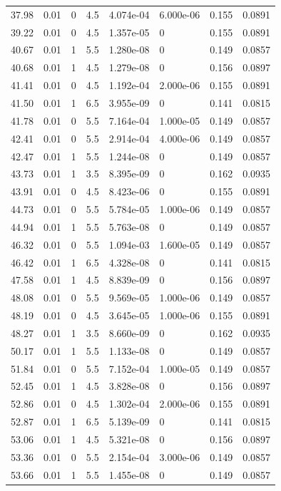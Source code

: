 \documentclass[preview]{standalone}
\begin{document}
{{{\begin{tabular}{L{1.2cm}C{1.2cm} C{0.3cm}C{0.5cm} C{1.4cm}C{1.4cm} C{1.4cm}C{1.4cm}}
  37.98  &  0.01  & 0     & 4.5 &  4.074e-04  & 6.000e-06  & 0.155 &  0.0891   \\ 
  39.22  &  0.01  & 0     & 4.5 &  1.357e-05  & 0  & 0.155 &  0.0891   \\ 
  40.67  &  0.01  & 1     & 5.5 &  1.280e-08  & 0  & 0.149 &  0.0857   \\ 
  40.68  &  0.01  & 1     & 4.5 &  1.279e-08  & 0  & 0.156 &  0.0897   \\ 
  41.41  &  0.01  & 0     & 4.5 &  1.192e-04  & 2.000e-06  & 0.155 &  0.0891   \\ 
  41.50  &  0.01  & 1     & 6.5 &  3.955e-09  & 0  & 0.141 &  0.0815   \\ 
  41.78  &  0.01  & 0     & 5.5 &  7.164e-04  & 1.000e-05  & 0.149 &  0.0857   \\ 
  42.41  &  0.01  & 0     & 5.5 &  2.914e-04  & 4.000e-06  & 0.149 &  0.0857   \\ 
  42.47  &  0.01  & 1     & 5.5 &  1.244e-08  & 0  & 0.149 &  0.0857   \\ 
  43.73  &  0.01  & 1     & 3.5 &  8.395e-09  & 0  & 0.162 &  0.0935   \\ 
  43.91  &  0.01  & 0     & 4.5 &  8.423e-06  & 0  & 0.155 &  0.0891   \\ 
  44.73  &  0.01  & 0     & 5.5 &  5.784e-05  & 1.000e-06  & 0.149 &  0.0857   \\ 
  44.94  &  0.01  & 1     & 5.5 &  5.763e-08  & 0  & 0.149 &  0.0857   \\ 
  46.32  &  0.01  & 0     & 5.5 &  1.094e-03  & 1.600e-05  & 0.149 &  0.0857   \\ 
  46.42  &  0.01  & 1     & 6.5 &  4.328e-08  & 0  & 0.141 &  0.0815   \\ 
  47.58  &  0.01  & 1     & 4.5 &  8.839e-09  & 0  & 0.156 &  0.0897   \\ 
  48.08  &  0.01  & 0     & 5.5 &  9.569e-05  & 1.000e-06  & 0.149 &  0.0857   \\ 
  48.19  &  0.01  & 0     & 4.5 &  3.645e-05  & 1.000e-06  & 0.155 &  0.0891   \\ 
  48.27  &  0.01  & 1     & 3.5 &  8.660e-09  & 0  & 0.162 &  0.0935   \\ 
  50.17  &  0.01  & 1     & 5.5 &  1.133e-08  & 0  & 0.149 &  0.0857   \\ 
  51.84  &  0.01  & 0     & 5.5 &  7.152e-04  & 1.000e-05  & 0.149 &  0.0857   \\ 
  52.45  &  0.01  & 1     & 4.5 &  3.828e-08  & 0  & 0.156 &  0.0897   \\ 
  52.86  &  0.01  & 0     & 4.5 &  1.302e-04  & 2.000e-06  & 0.155 &  0.0891   \\ 
  52.87  &  0.01  & 1     & 6.5 &  5.139e-09  & 0  & 0.141 &  0.0815   \\ 
  53.06  &  0.01  & 1     & 4.5 &  5.321e-08  & 0  & 0.156 &  0.0897   \\ 
  53.36  &  0.01  & 0     & 5.5 &  2.154e-04  & 3.000e-06  & 0.149 &  0.0857   \\ 
  53.66  &  0.01  & 1     & 5.5 &  1.455e-08  & 0  & 0.149 &  0.0857   \\ 
\hline 
\end{tabular} 

}}}
\end{document}
